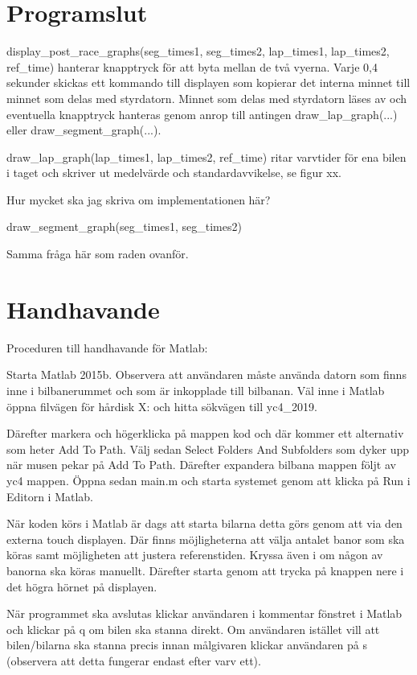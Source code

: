 \documentclass[10pt,oneside,swedish]{lips-no_customer}
\begin{document}
\section{Programslut}

display\_post\_race\_graphs(seg\_times1, seg\_times2, lap\_times1, lap\_times2,
ref\_time) hanterar knapptryck för att byta mellan de två vyerna. Varje 0,4
sekunder skickas ett kommando till displayen som kopierar det interna minnet
till minnet som delas med styrdatorn. Minnet som delas med styrdatorn läses av
och eventuella knapptryck hanteras genom anrop till antingen
draw\_lap\_graph(...) eller draw\_segment\_graph(...).

draw\_lap\_graph(lap\_times1, lap\_times2, ref\_time) ritar varvtider för
ena bilen i taget och skriver ut medelvärde och standardavvikelse, se figur xx.

Hur mycket ska jag skriva om implementationen här?

draw\_segment\_graph(seg\_times1, seg\_times2)

Samma fråga här som raden ovanför.




\cleardoublepage
\appendix
\section{Handhavande}
Proceduren till handhavande för Matlab:

Starta Matlab 2015b. Observera att användaren måste använda datorn som finns
inne i bilbanerummet och som är inkopplade till bilbanan. Väl inne i Matlab
öppna filvägen för hårdisk X: och hitta sökvägen till yc4\_2019.

Därefter markera och högerklicka på mappen kod och där kommer ett alternativ som
heter Add To Path. Välj sedan Select Folders And Subfolders som dyker upp när
musen pekar på Add To Path. Därefter expandera bilbana mappen följt av yc4
mappen. Öppna sedan main.m och starta systemet genom att klicka på Run i Editorn
i Matlab.

När koden körs i Matlab är dags att starta bilarna detta görs genom att via den
externa touch displayen. Där finns möjligheterna att välja antalet banor som ska
köras samt möjligheten att justera referenstiden. Kryssa även i om någon av
banorna ska köras manuellt. Därefter starta genom att trycka på knappen nere i
det högra hörnet på displayen.

När programmet ska avslutas klickar användaren i kommentar fönstret i Matlab och
klickar på q om bilen ska stanna direkt. Om användaren istället vill att
bilen/bilarna ska stanna precis innan målgivaren klickar användaren på s
(observera att detta fungerar endast efter varv ett).
\end{document}

